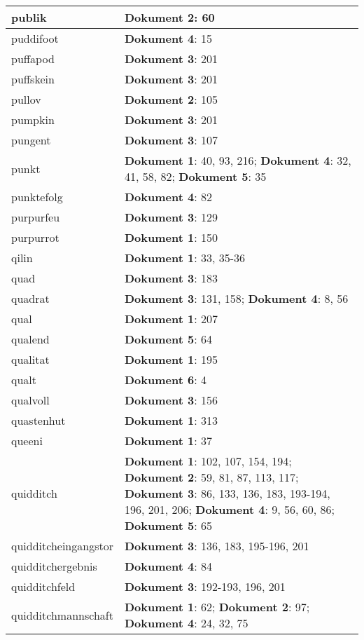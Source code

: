\documentclass[a5paper]{article}
\begin{document}
\begin{longtable}[l]{|l|p{3in}|}
\hline
publik & \textbf{Dokument 2}: 60 \\
\hline
puddifoot & \textbf{Dokument 4}: 15 \\
\hline
puffapod & \textbf{Dokument 3}: 201 \\
\hline
puffskein & \textbf{Dokument 3}: 201 \\
\hline
pullov & \textbf{Dokument 2}: 105 \\
\hline
pumpkin & \textbf{Dokument 3}: 201 \\
\hline
pungent & \textbf{Dokument 3}: 107 \\
\hline
punkt & \textbf{Dokument 1}: 40, 93, 216; \textbf{Dokument 4}: 32, 41, 58, 82; \textbf{Dokument 5}: 35 \\
\hline
punktefolg & \textbf{Dokument 4}: 82 \\
\hline
purpurfeu & \textbf{Dokument 3}: 129 \\
\hline
purpurrot & \textbf{Dokument 1}: 150 \\
\hline
qilin & \textbf{Dokument 1}: 33, 35-36 \\
\hline
quad & \textbf{Dokument 3}: 183 \\
\hline
quadrat & \textbf{Dokument 3}: 131, 158; \textbf{Dokument 4}: 8, 56 \\
\hline
qual & \textbf{Dokument 1}: 207 \\
\hline
qualend & \textbf{Dokument 5}: 64 \\
\hline
qualitat & \textbf{Dokument 1}: 195 \\
\hline
qualt & \textbf{Dokument 6}: 4 \\
\hline
qualvoll & \textbf{Dokument 3}: 156 \\
\hline
quastenhut & \textbf{Dokument 1}: 313 \\
\hline
queeni & \textbf{Dokument 1}: 37 \\
\hline
quidditch & \textbf{Dokument 1}: 102, 107, 154, 194; \textbf{Dokument 2}: 59, 81, 87, 113, 117; \textbf{Dokument 3}: 86, 133, 136, 183, 193-194, 196, 201, 206; \textbf{Dokument 4}: 9, 56, 60, 86; \textbf{Dokument 5}: 65 \\
\hline
quidditcheingangstor & \textbf{Dokument 3}: 136, 183, 195-196, 201 \\
\hline
quidditchergebnis & \textbf{Dokument 4}: 84 \\
\hline
quidditchfeld & \textbf{Dokument 3}: 192-193, 196, 201 \\
\hline
quidditchmannschaft & \textbf{Dokument 1}: 62; \textbf{Dokument 2}: 97; \textbf{Dokument 4}: 24, 32, 75 \\

\end{longtable}
\end{document}
